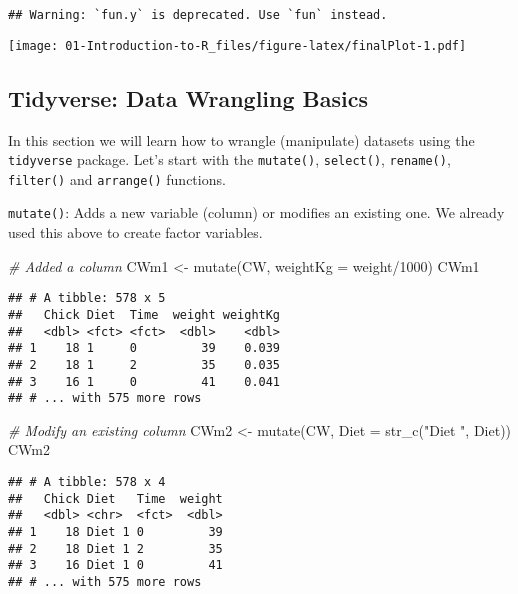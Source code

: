 \documentclass[
]{book}
\newenvironment{Shaded}{\begin{snugshade}}{\end{snugshade}}
\newcommand{\AttributeTok}[1]{\textcolor[rgb]{0.77,0.63,0.00}{#1}}
\newcommand{\CommentTok}[1]{\textcolor[rgb]{0.56,0.35,0.01}{\textit{#1}}}
\newcommand{\DecValTok}[1]{\textcolor[rgb]{0.00,0.00,0.81}{#1}}
\newcommand{\FunctionTok}[1]{\textcolor[rgb]{0.00,0.00,0.00}{#1}}
\newcommand{\NormalTok}[1]{#1}
\newcommand{\OtherTok}[1]{\textcolor[rgb]{0.56,0.35,0.01}{#1}}
\newcommand{\SpecialCharTok}[1]{\textcolor[rgb]{0.00,0.00,0.00}{#1}}
\newcommand{\StringTok}[1]{\textcolor[rgb]{0.31,0.60,0.02}{#1}}
\begin{document}
\begin{verbatim}
## Warning: `fun.y` is deprecated. Use `fun` instead.
\end{verbatim}

\texttt{[image: 01-Introduction-to-R\_files/figure-latex/finalPlot-1.pdf]}

\hypertarget{tidyverse-data-wrangling-basics}{%
\subsection{Tidyverse: Data Wrangling Basics}\label{tidyverse-data-wrangling-basics}}

In this section we will learn how to wrangle (manipulate) datasets using the \texttt{tidyverse}
package. Let's start with the \texttt{mutate()}, \texttt{select()}, \texttt{rename()}, \texttt{filter()} and \texttt{arrange()}
functions.

\hfill\break

\texttt{mutate()}: Adds a new variable (column) or modifies an existing one. We already used this above to create
factor variables.

\begin{Shaded}
\begin{Highlighting}[]
\CommentTok{\# Added a column}
\NormalTok{CWm1 }\OtherTok{\textless{}{-}} \FunctionTok{mutate}\NormalTok{(CW, }\AttributeTok{weightKg =}\NormalTok{ weight}\SpecialCharTok{/}\DecValTok{1000}\NormalTok{)}
\NormalTok{CWm1}
\end{Highlighting}
\end{Shaded}

\begin{verbatim}
## # A tibble: 578 x 5
##   Chick Diet  Time  weight weightKg
##   <dbl> <fct> <fct>  <dbl>    <dbl>
## 1    18 1     0         39    0.039
## 2    18 1     2         35    0.035
## 3    16 1     0         41    0.041
## # ... with 575 more rows
\end{verbatim}

\begin{Shaded}
\begin{Highlighting}[]
\CommentTok{\# Modify an existing column}
\NormalTok{CWm2 }\OtherTok{\textless{}{-}} \FunctionTok{mutate}\NormalTok{(CW, }\AttributeTok{Diet =} \FunctionTok{str\_c}\NormalTok{(}\StringTok{"Diet "}\NormalTok{, Diet))}
\NormalTok{CWm2}
\end{Highlighting}
\end{Shaded}

\begin{verbatim}
## # A tibble: 578 x 4
##   Chick Diet   Time  weight
##   <dbl> <chr>  <fct>  <dbl>
## 1    18 Diet 1 0         39
## 2    18 Diet 1 2         35
## 3    16 Diet 1 0         41
## # ... with 575 more rows
\end{verbatim}
\end{document}
